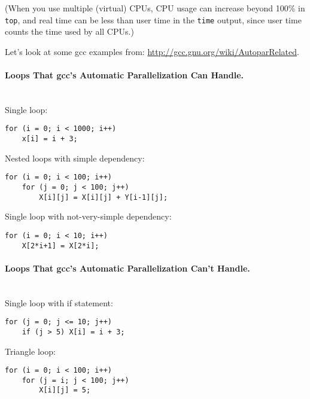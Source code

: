 (When you use multiple (virtual) CPUs, CPU usage can increase beyond
100\% in {\tt top}, and real time can be less than user time in
the {\tt time} output, since user time counts the time used by all CPUs.)

Let's look at some gcc examples from: \url{http://gcc.gnu.org/wiki/AutoparRelated}.

\paragraph{Loops That gcc's Automatic Parallelization Can Handle.}~\\

  Single loop:
  \begin{verbatim}
for (i = 0; i < 1000; i++)
    x[i] = i + 3;
  \end{verbatim}

  Nested loops with simple dependency:
  \begin{verbatim}
for (i = 0; i < 100; i++)
    for (j = 0; j < 100; j++)
        X[i][j] = X[i][j] + Y[i-1][j];
  \end{verbatim}

  Single loop with not-very-simple dependency:
  \begin{verbatim}
for (i = 0; i < 10; i++)
    X[2*i+1] = X[2*i];
  \end{verbatim}

\paragraph{Loops That gcc's Automatic Parallelization Can't Handle.}~\\

  Single loop with if statement:
  \begin{verbatim}
for (j = 0; j <= 10; j++)
    if (j > 5) X[i] = i + 3;
  \end{verbatim}

  Triangle loop:
  \begin{verbatim}
for (i = 0; i < 100; i++)
    for (j = i; j < 100; j++)
        X[i][j] = 5;
  \end{verbatim}

